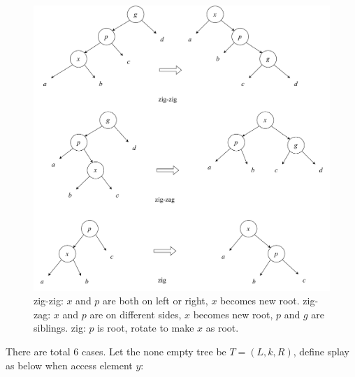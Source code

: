 \documentclass[b5paper]{article}
\begin{document}
\begin{figure}[htbp]
  \centering
  \includegraphics[scale=0.45]{img/splay}
  \caption{zig-zig: $x$ and $p$ are both on left or right, $x$ becomes new root. zig-zag: $x$ and $p$ are on different sides, $x$ becomes new root, $p$ and $g$ are siblings. zig: $p$ is root, rotate to make $x$ as root.}
  \label{fig:splay}
\end{figure}

There are total 6 cases. Let the none empty tree be $T=(L, k, R)$, define splay as below when access element $y$:
\end{document}
